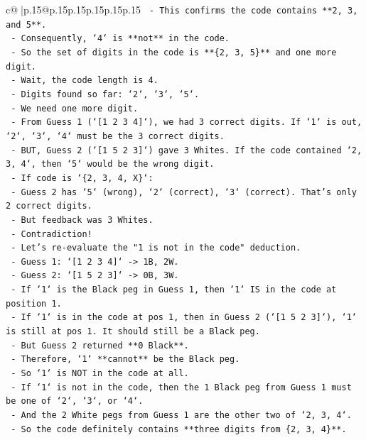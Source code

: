 \documentclass{article}
\begin{document}
{\begin{supertabular}{c@{$\;$}|p{.15\linewidth}@{}p{.15\linewidth}p{.15\linewidth}p{.15\linewidth}p{.15\linewidth}p{.15\linewidth}}
{{{\texttt{    {-} This confirms the code contains **2, 3, and 5**.} \\
\texttt{    {-} Consequently, `4` is **not** in the code.} \\
\texttt{    {-} So the set of digits in the code is **\{2, 3, 5\}** and one more digit.} \\
\texttt{    {-} Wait, the code length is 4.} \\
\texttt{    {-} Digits found so far: `2`, `3`, `5`.} \\
\texttt{    {-} We need one more digit.} \\
\texttt{    {-} From Guess 1 (`{[}1 2 3 4{]}`), we had 3 correct digits. If `1` is out, `2`, `3`, `4` must be the 3 correct digits.} \\
\texttt{    {-} BUT, Guess 2 (`{[}1 5 2 3{]}`) gave 3 Whites. If the code contained `2, 3, 4`, then `5` would be the wrong digit.} \\
\texttt{      {-} If code is `\{2, 3, 4, X\}`:} \\
\texttt{        {-} Guess 2 has `5` (wrong), `2` (correct), `3` (correct). That's only 2 correct digits.} \\
\texttt{        {-} But feedback was 3 Whites.} \\
\texttt{      {-} Contradiction!} \\
\texttt{    {-} Let's re{-}evaluate the "1 is not in the code" deduction.} \\
\texttt{      {-} Guess 1: `{[}1 2 3 4{]}` {-}> 1B, 2W.} \\
\texttt{      {-} Guess 2: `{[}1 5 2 3{]}` {-}> 0B, 3W.} \\
\texttt{      {-} If `1` is the Black peg in Guess 1, then `1` IS in the code at position 1.} \\
\texttt{      {-} If `1` is in the code at pos 1, then in Guess 2 (`{[}1 5 2 3{]}`), `1` is still at pos 1. It should still be a Black peg.} \\
\texttt{      {-} But Guess 2 returned **0 Black**.} \\
\texttt{      {-} Therefore, `1` **cannot** be the Black peg.} \\
\texttt{      {-} So `1` is NOT in the code at all.} \\
\texttt{      {-} If `1` is not in the code, then the 1 Black peg from Guess 1 must be one of `2`, `3`, or `4`.} \\
\texttt{      {-} And the 2 White pegs from Guess 1 are the other two of `2, 3, 4`.} \\
\texttt{      {-} So the code definitely contains **three digits from \{2, 3, 4\}**.} \\
}}}
\end{supertabular}}
\end{document}
